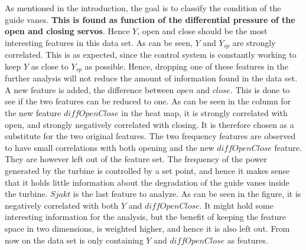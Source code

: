         As mentioned in the introduction, the goal is to classify the condition of the guide vanes. \textbf{This is found as function of the differential pressure of the open and closing servos}. Hence $Y$, open and close should be the most interesting features in this data set. As can be seen, $Y$ and $Y_{sp}$ are strongly correlated. This is as expected, since the control system is constantly working to keep $Y$ as close to $Y_{sp}$ as possible. Hence, dropping one of these features in the further analysis will not reduce the amount of information found in the data set. A new feature is added, the difference between $open$ and $close$. This is done to see if the two features can be reduced to one. As can be seen in the column for the new feature $diffOpenClose$ in the heat map, it is strongly correlated with open, and strongly negatively correlated with closing. It is therefore chosen as a substitute for the two original features. The two frequency features are observed to have small correlations with both opening and the new $diffOpenClose$ feature. They are however left out of the feature set. The frequency of the power generated by the turbine is controlled by a set point, and hence it makes sense that it holds little information about the degradation of the guide vanes inside the turbine. $Sjakt$ is the last feature to analyze. As can be seen in the figure, it is negatively correlated with both $Y$ and $diffOpenClose$. It might hold some interesting information for the analysis, but the benefit of keeping the feature space in two dimensions, is weighted higher, and hence it is also left out. From now on the data set is only containing $Y$ and $diffOpenClose$ as features.    
        
